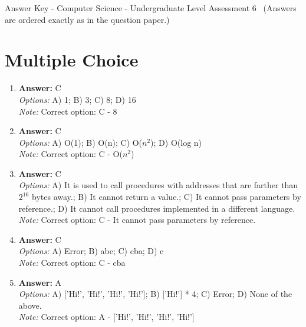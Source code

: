 \documentclass[12pt]{article}
\begin{document}
\begin{center}
Answer Key - Computer Science - Undergraduate Level Assessment 6 \
\small (Answers are ordered exactly as in the question paper.)
\end{center}

\section*{Multiple Choice}
\begin{enumerate}[label=\arabic*.]
\item \textbf{Answer:} C
\\ \textit{Options:} A) 1; B) 3; C) 8; D) 16
\\ \textit{Note:} Correct option: C - 8
\item \textbf{Answer:} C
\\ \textit{Options:} A) O(1); B) O(n); C) O($n^2$); D) O(log n)
\\ \textit{Note:} Correct option: C - O($n^2$)
\item \textbf{Answer:} C
\\ \textit{Options:} A) It is used to call procedures with addresses that are farther than $2^16$ bytes away.; B) It cannot return a value.; C) It cannot pass parameters by reference.; D) It cannot call procedures implemented in a different language.
\\ \textit{Note:} Correct option: C - It cannot pass parameters by reference.
\item \textbf{Answer:} C
\\ \textit{Options:} A) Error; B) abc; C) cba; D) c
\\ \textit{Note:} Correct option: C - cba
\item \textbf{Answer:} A
\\ \textit{Options:} A) ['Hi!', 'Hi!', 'Hi!', 'Hi!']; B) ['Hi!'] * 4; C) Error; D) None of the above.
\\ \textit{Note:} Correct option: A - ['Hi!', 'Hi!', 'Hi!', 'Hi!']
\end{enumerate}
\end{document}
